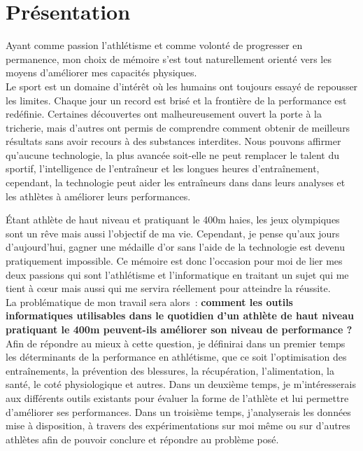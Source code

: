 \chapter*{Présentation}
\label{chap:introduction}

Ayant comme passion l'athlétisme et comme volonté de progresser en permanence, mon choix de mémoire s'est tout naturellement orienté vers les moyens d'améliorer mes capacités physiques.\\

Le sport est un domaine d'intérêt où les humains ont toujours essayé de repousser les limites. Chaque jour un record est brisé et la frontière de la performance est redéfinie.
Certaines découvertes ont malheureusement ouvert la porte à la tricherie, mais d’autres ont permis de comprendre comment obtenir de meilleurs résultats sans avoir recours à des substances interdites.  Nous pouvons affirmer qu'aucune technologie, la plus avancée soit-elle ne peut remplacer le talent du sportif, l'intelligence de l’entraîneur et les longues heures d’entraînement, cependant, la technologie  peut aider les entraîneurs  dans dans leurs analyses et les athlètes à améliorer leurs performances.

Étant athlète de haut niveau et pratiquant le 400m haies, les jeux olympiques sont un rêve mais aussi l'objectif de ma vie. Cependant, je pense qu'aux jours d'aujourd'hui, gagner une médaille d'or sans l'aide de la technologie est devenu pratiquement impossible.  Ce mémoire est donc l'occasion pour moi de lier mes deux passions  qui sont l'athlétisme et l'informatique en traitant un sujet qui me tient à cœur mais aussi qui me servira réellement pour atteindre la réussite.\\

La problématique de mon travail sera alors : \textbf{comment les outils informatiques utilisables dans le quotidien d'un athlète de haut niveau pratiquant le 400m peuvent-ils améliorer son niveau de performance ?} \\

Afin de répondre au mieux à cette question, je définirai dans un premier temps les déterminants de la performance en athlétisme, que ce soit l'optimisation des entraînements, la prévention des blessures, la récupération, l'alimentation, la santé, le coté physiologique et autres.
Dans un deuxième temps, je m’intéresserais aux différents outils existants pour évaluer la forme de l'athlète et lui permettre d'améliorer ses performances.
Dans un troisième temps, j'analyserais les données mise à disposition, à travers des expérimentations sur moi même ou sur d'autres athlètes afin de pouvoir conclure et répondre au problème posé.\\

